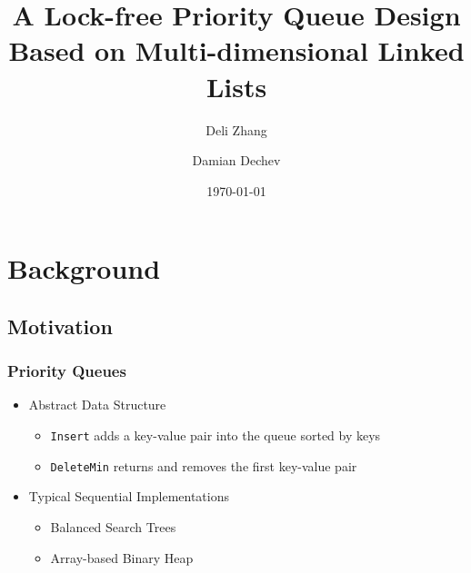 \documentclass{beamer}
\begin{document}
\title{A Lock-free Priority Queue Design Based on Multi-dimensional Linked Lists}
\author[D. Zhang \and D. Dechev]{Deli Zhang \and Damian Dechev}
\date{\today}

\begin{frame}
    \titlepage
\end{frame}


\section{Background}
\subsection{Motivation}
\begin{frame} \frametitle{Priority Queues}
    \begin{itemize}
        \item Abstract Data Structure
            \begin{itemize}
                \item \texttt{Insert} adds a key-value pair into the queue sorted by keys
                \item \texttt{DeleteMin} returns and removes the first key-value pair
            \end{itemize}
        \item Typical Sequential Implementations
            \begin{itemize}
                \item Balanced Search Trees
                \item Array-based Binary Heap
            \end{itemize}
    \end{itemize}
\end{frame}
\end{document}
